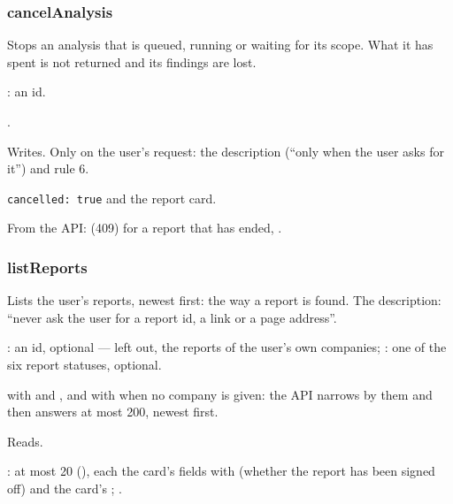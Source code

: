 \subsubsection{cancelAnalysis}\label{sec:tools:cancelAnalysis}
\begin{description}[style=multiline, leftmargin=19mm, labelwidth=17mm, labelsep=2mm,
  font=\sffamily\bfseries\footnotesize\color{ink}, itemsep=1pt, topsep=2pt, before=\raggedright]
  \item[Does] Stops an analysis that is queued, running or waiting for its scope. What it has
    spent is not returned and its findings are lost.
  \item[Input] : an id.
  \item[Calls] .
  \item[Kind] Writes. Only on the user's request: the description (\enquote{only when the user
    asks for it}) and rule 6.
  \item[Returns] \texttt{cancelled: true} and the report card.
  \item[Errors] From the API:  (409) for a report that has ended,
    .
\end{description}

\subsubsection{listReports}\label{sec:tools:listReports}
\begin{description}[style=multiline, leftmargin=19mm, labelwidth=17mm, labelsep=2mm,
  font=\sffamily\bfseries\footnotesize\color{ink}, itemsep=1pt, topsep=2pt, before=\raggedright]
  \item[Does] Lists the user's reports, newest first: the way a report is found. The
    description: \enquote{never ask the user for a report id, a link or a page address}.
  \item[Input] : an id, optional --- left out, the reports of the user's own
    companies; : one of the six report statuses, optional.
  \item[Calls]  with  and , and with
     when no company is given: the API narrows by them and then answers at
    most 200, newest first.
  \item[Kind] Reads.
  \item[Returns] : at most 20 (), each the card's
     fields with  (whether the report has been signed off) and
    the card's ; .
\end{description}

